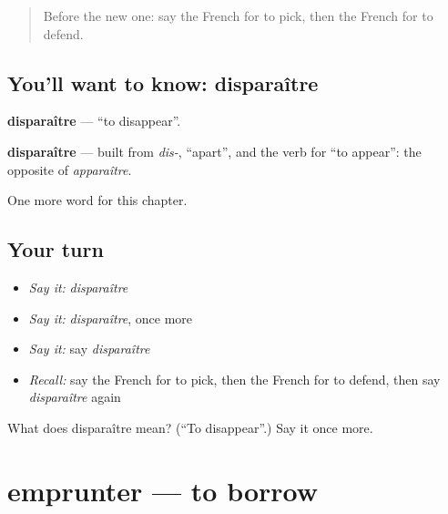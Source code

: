 \label{lesson:FR-C184-disparaitre}



\begin{quote}
Before the new one: say the French for to pick, then the French for to defend.
\end{quote}

\subsection*{You'll want to know: disparaître}
\textbf{disparaître} — \textquotedblleft{}to disappear\textquotedblright{}.

\begin{cousinweb}
\textbf{disparaître} — built from \emph{dis-}, \textquotedblleft{}apart\textquotedblright{}, and the verb for \textquotedblleft{}to appear\textquotedblright{}: the opposite of \emph{apparaître}.
\end{cousinweb}

\begin{grammarlens}[title={What you've built}]
One more word for this chapter.
\end{grammarlens}

\subsection*{Your turn}
\begin{itemize}
\raggedright
  \item \emph{Say it:} \emph{disparaître}
  \item \emph{Say it:} \emph{disparaître}, once more
  \item \emph{Say it:} say \emph{disparaître}
  \item \emph{Recall:} say the French for to pick, then the French for to defend, then say \emph{disparaître} again
\end{itemize}

\begin{tcolorbox}[breakable,colback=teal!4,colframe=teal!35!black,title={Before you move on}]
What does disparaître mean? (\textquotedblleft{}To disappear\textquotedblright{}.) Say it once more.
\end{tcolorbox}
\section[emprunter]{emprunter — to borrow}

\label{lesson:FR-C184-emprunter}



